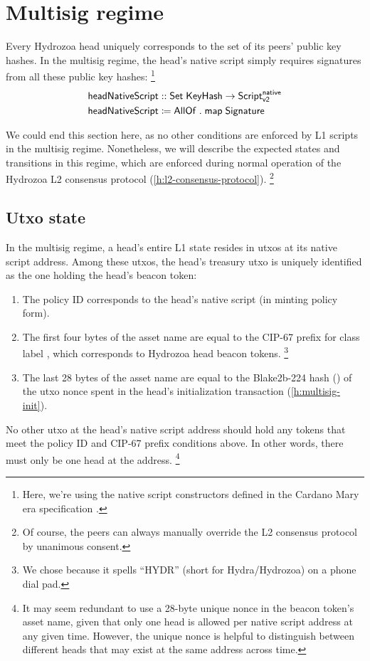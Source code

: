 \documentclass[../hydrozoa.tex]{subfiles}
\begin{document}
\section{Multisig regime}%
\label{h:multisig-regime}%
Every Hydrozoa head uniquely corresponds to the set of its peers' public key hashes.
In the multisig regime, the head's native script simply requires signatures from all these public key hashes:%
\footnote{Here, we're using the native script constructors defined in the Cardano Mary era specification \citep{PolinaVinogradovaAndreKnispelFormalSpecificationCardano2020}.}
\begin{equation*}
\begin{split}
  \mathsf{headNativeScript} &:: \mathsf{Set} \; \mathsf{KeyHash} -> \mathsf{Script}^{\mathsf{native}}_{\mathsf{v2}} \\
  \mathsf{headNativeScript} &\coloneq
    \mathsf{AllOf} \;.\; \mathsf{map} \; \mathsf{Signature}
\end{split}
\end{equation*}

We could end this section here, as no other conditions are enforced by L1 scripts in the multisig regime.
Nonetheless, we will describe the expected states and transitions in this regime, which are enforced during normal operation of the Hydrozoa L2 consensus protocol (\cref{h:l2-consensus-protocol}).%
\footnote{Of course, the peers can always manually override the L2 consensus protocol by unanimous consent.}

\subsection{Utxo state}%
\label{h:multisig-utxo-state}%
In the multisig regime, a head's entire L1 state resides in utxos at its native script address.
Among these utxos, the head's treasury utxo is uniquely identified as the one holding the head's beacon token:
\begin{enumerate}
  \item The policy ID corresponds to the head's native script (in minting policy form).
  \item The first four bytes of the asset name are equal to the CIP-67
    \citep{AlessandroKonradThomasVellekoopCIP67AssetName2022}
    prefix for class label , which corresponds to Hydrozoa head beacon tokens.%
    \footnote{We chose  because it spells ``HYDR'' (short for Hydra/Hydrozoa) on a phone dial pad.}
  \item The last 28 bytes of the asset name are equal to the Blake2b-224 hash () of the utxo nonce spent in the head's initialization transaction (\cref{h:multisig-init}).
\end{enumerate}
No other utxo at the head's native script address should hold any tokens that meet the policy ID and CIP-67 prefix conditions above. In other words, there must only be one head at the address.%
\footnote{It may seem redundant to use a 28-byte unique nonce in the beacon token's asset name, given that only one head is allowed per native script address at any given time.
  However, the unique nonce is helpful to distinguish between different heads that may exist at the same address across time.}
\end{document}
